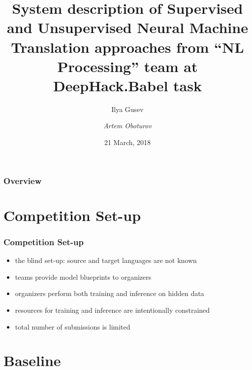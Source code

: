 \documentclass{beamer}
\title[Supervised and Unsupervised NMT]{System description of Supervised and Unsupervised Neural Machine Translation approaches from “NL Processing” team at DeepHack.Babel task}
\author[Gusev, Oboturov]{Ilya Gusev \inst{1} \and \it{Artem Oboturov} \inst{2}}
\institute[]{\inst{1} MIPT \url{ilya.gusev@phystech.edu} \and %
                      \inst{2} \url{oboturov@gmail.com}}
\date{21 March, 2018}
\begin{document}
\begin{frame}
\titlepage %
\end{frame}

\begin{frame}
\frametitle{Overview}
\tableofcontents
\end{frame}


\section{Competition Set-up}

\begin{frame}
\frametitle{Competition Set-up}

\begin{itemize}
\item the blind set-up: source and target languages are not known
\item teams provide model blueprints to organizers
\item organizers perform both training and inference on hidden data
\item resources for training and inference are intentionally constrained
\item total number of submissions is limited
\end{itemize}


\end{frame}

\section{Baseline}
\end{document}
